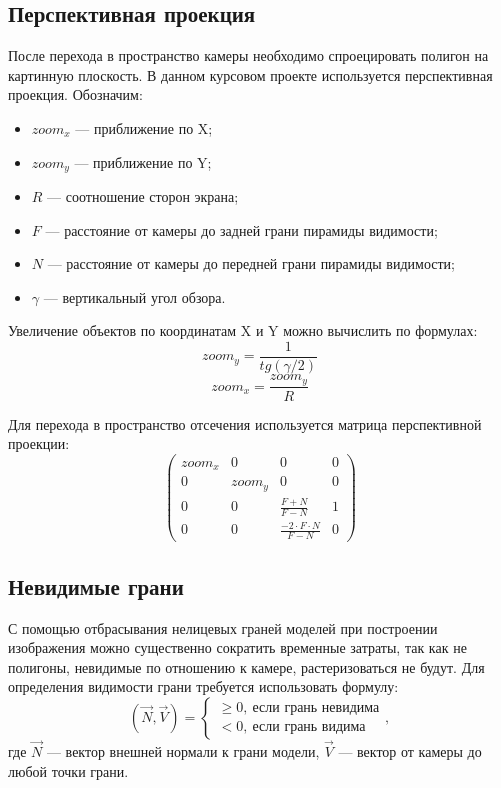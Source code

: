 \subsection{Перспективная проекция}

После перехода в пространство камеры необходимо спроецировать полигон на картинную плоскость.
В данном курсовом проекте используется перспективная проекция.
Обозначим:
\begin{itemize}
	\item $zoom_x$ --- приближение по X;
	\item $zoom_y$ --- приближение по Y;
	\item $R$ --- соотношение сторон экрана;
	\item $F$ --- расстояние от камеры до задней грани пирамиды видимости;
	\item $N$ --- расстояние от камеры до передней грани пирамиды видимости;
	\item $\gamma$ --- вертикальный угол обзора.
\end{itemize}
Увеличение объектов по координатам X и Y можно вычислить по формулах:
\begin{equation}
	zoom_y = \frac{1}{tg(\gamma / 2)}
\end{equation}
\begin{equation}
	zoom_x = \frac{zoom_y}{R}
\end{equation}

Для перехода в пространство отсечения используется матрица перспективной проекции:
\begin{equation}
	\begin{pmatrix}
		zoom_x  & 0  & 0  & 0 \\
		0   & zoom_y  & 0  & 0 \\
		0   & 0   & \frac{F + N}{F - N}  & 1 \\
		0   & 0   & \frac{-2 \cdot F \cdot N}{F - N}  & 0
	\end{pmatrix}
\end{equation}

\subsection{Невидимые грани}

С помощью отбрасывания нелицевых граней моделей при построении изображения можно существенно сократить временные затраты, так как не полигоны, невидимые по отношению к камере, растеризоваться не будут.
Для определения видимости грани требуется использовать формулу:
\begin{equation}
	(\overrightarrow{N}, \overrightarrow{V}) = \begin{cases}
		 \geq 0,~\text{если грань невидима} \\
		 < 0,~\text{если грань видима}
	\end{cases},
\end{equation}
где $\overrightarrow{N}$ --- вектор внешней нормали к грани модели, $\overrightarrow{V}$ --- вектор от камеры до любой точки грани.

